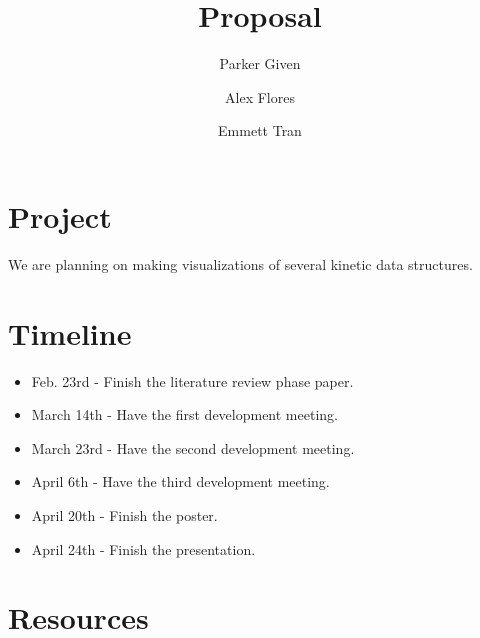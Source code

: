 \documentclass[secnumarabic,amssymb, nobibnotes, aps, pra]{revtex4}
\begin{document}
\title{Proposal}
\author{Parker Given}
\author{Alex Flores}
\affiliation{}
\author{Emmett Tran}
\affiliation{}

\maketitle

\section{Project}
We are planning on making visualizations of several kinetic data structures.
\section{Timeline}
\begin{itemize}%
\item Feb. 23rd - Finish the literature review phase paper.
\item March 14th - Have the first development meeting.
\item March 23rd - Have the second development meeting.
\item April 6th - Have the third development meeting.
\item April 20th - Finish the poster.
\item April 24th - Finish the presentation. %
\end{itemize}

\section{Resources}
\end{document}
